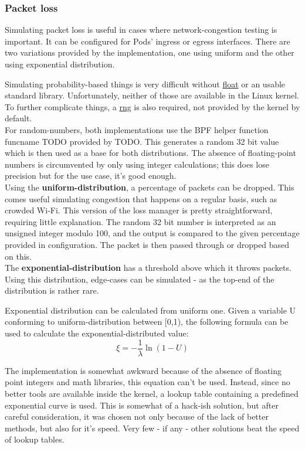 \subsubsection{Packet loss}
Simulating packet loss is useful in cases where network-congestion testing is important. It can be configured for Pods' ingress or egress interfaces. There are two variations provided by the implementation, one using uniform and the other using exponential distribution.

Simulating probability-based things is very difficult without \underline{\gls{float}} or an usable standard library. Unfortunately, neither of those are available in the Linux kernel. To further complicate things, a \underline{\gls{rng}} is also required, not provided by the kernel by default. \\

For random-numbers, both implementations use the BPF helper function funcname TODO provided by TODO. This generates a random 32 bit value which is then used as a base for both distributions. The absence of floating-point numbers is circumvented by only using integer calculations; this does lose precision but for the use case, it's good enough. \\

Using the \textbf{uniform-distribution}, a percentage of packets can be dropped. This comes useful simulating congestion that happens on a regular basis, such as crowded Wi-Fi. This version of the loss manager is pretty straightforward, requiring little explanation. The random 32 bit number is interpreted as an unsigned integer modulo 100, and the output is compared to the given percentage provided in configuration. The packet is then passed through or dropped based on this. \\

The \textbf{exponential-distribution} has a threshold above which it throws packets. Using this distribution, edge-cases can be simulated - as the top-end of the distribution is rather rare.

Exponential distribution can be calculated from uniform one. Given a variable U conforming to uniform-distribution between [0,1), the following formula can be used to calculate the exponential-distributed value:
$$\xi = -\frac{1}{\lambda}\ln(1-U)$$

\newpage
The implementation is somewhat awkward because of the absence of floating point integers and math libraries, this equation can't be used. Instead, since no better tools are available inside the kernel, a lookup table containing a predefined exponential curve is used. This is somewhat of a hack-ish solution, but after careful consideration, it was chosen not only because of the lack of better methods, but also for it's speed. Very few - if any - other solutions beat the speed of lookup tables.

